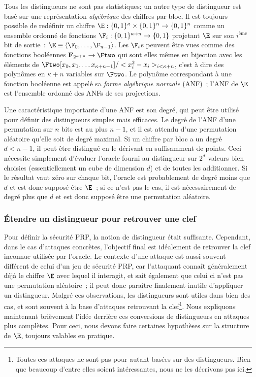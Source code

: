\bigskip

Tous les distingueurs ne sont pas statistiques;
un autre type de distingueur est basé sur une représentation \emph{algébrique} des chiffres par bloc.
Il est toujours possible de redéfinir un chiffre 
$\E : \{0,1\}^\kappa \times \{0,1\}^n \rightarrow \{0,1\}^n$ comme un ensemble ordonné de fonctions $\F_i : \{0,1\}^{\kappa+n} \rightarrow \{0,1\}$ projetant
$\E$ sur son $i^\text{ème}$ bit de sortie~: $\E \equiv \langle \F_0, \ldots, \F_{n-1} \rangle$. Les $\F_i$s peuvent être vues comme des fonctions booléennes
$\mathbf{F}_{2^{\kappa + n}} \rightarrow \Ftwo$ qui sont elles mêmes en bijection avec les éléments de $\Ftwo[x_0,x_1,\ldots x_{\kappa + n-1}]/<x_i^2-x_i>_{i<\kappa + n}$,
c'est à dire des polynômes en $\kappa + n$ variables sur $\Ftwo$. Le polynôme correspondant à une fonction booléenne est appelé sa \emph{forme algébrique normale}
(ANF)~;
l'ANF de $\E$ est l'ensemble ordonné des ANFs de ses projections.

Une caractéristique importante d'une ANF est son degré, qui peut être utilisé pour définir des distingueurs simples mais efficaces.
Le degré de l'ANF d'une permutation sur $n$ bits est au plus $n - 1$, et il est attendu d'une permutation aléatoire qu'elle soit de degré
maximal. Si un chiffre par bloc a un degré $d < n - 1$, il peut être distingué en le dérivant en suffisamment de points.
Ceci nécessite simplement d'évaluer l'oracle fourni au distingueur sur $2^d$ valeurs bien choisies (essentiellement un cube de dimension $d$) et de toutes
les additionner.
Si le résultat vaut zéro sur chaque bit, l'oracle est probablement de degré moins que $d$ et est donc supposé être $\E$~; si ce n'est pas le cas, il est
nécessairement de degré plus que $d$ et est donc supposé être une permutation aléatoire.

\subsubsection{\'Etendre un distingueur pour retrouver une clef}

Pour définir la sécurité PRP, la notion de distingueur était suffisante. Cependant, dans le cas d'attaques concrètes, l'objectif
final est idéalement de retrouver la clef inconnue utilisée par l'oracle.
Le contexte d'une attaque est aussi souvent différent de celui d'un jeu de sécurité PRP, car l'attaquant connaît généralement déjà
le chiffre $\E$ avec lequel il interagit, et sait également que celui ci n'est pas une permutation aléatoire~; il peut donc paraître finalement inutile
d'appliquer un distingueur.
Malgré ces observations, les distingueurs sont utiles dans bien des cas, et sont souvent à la base d'attaques retrouvant la clef\footnote{Toutes ces
attaques ne sont pas pour autant basées sur des distingueurs. Bien que beaucoup d'entre elles soient intéressantes, nous ne les décrivons pas ici.}.
Nous expliquons maintenant brièvement l'idée derrière ces conversions de distingueurs en attaques plus complètes. Pour ceci, nous devons faire
certaines hypothèses sur la structure de $\E$, toujours valables en pratique.

